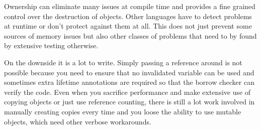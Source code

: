 \documentclass[conference,twocolumn]{IEEEtran}
\begin{document}
Ownership can eliminate many issues at compile time and provides a fine grained control over the destruction of objects.
Other languages have to detect problems at runtime or don't protect against them at all. This does not just prevent some sources of memory issues but also other classes of problems that need to by found by extensive testing otherwise.

On the downside it is a lot to write. Simply passing a reference around is not possible because you need to ensure that no invalidated variable can be used and sometimes extra lifetime annotations are required so that the borrow checker can verify the code. Even when you sacrifice performance and make extensive use of copying objects or just use reference counting, there is still a lot work involved in manually creating copies every time and you loose the ability to use mutable objects, which need other verbose workarounds.



{}
\end{document}
